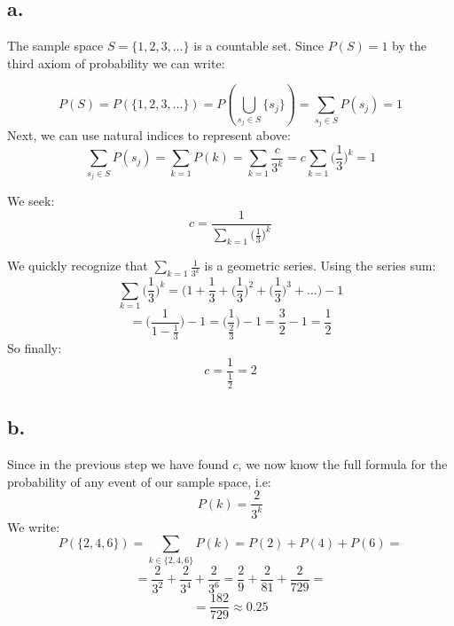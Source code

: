 \documentclass{article}
\begin{document}
\subsection*{a.}

The sample space \(S = \{1, 2, 3, \dots\}\) is a countable set. Since \(P(S) = 1\)
by the third axiom of probability we can write:

\begin{equation*}
    P(S) = P(\{1, 2, 3, \dots\}) = P(\bigcup_{s_{j} \in S} \{s_j\}) = \sum_{s_{j} \in S}P(s_{j}) = 1
\end{equation*}
Next, we can use natural indices to represent above:
\begin{equation*}
    \sum_{s_{j} \in S}P(s_{j}) = \sum_{k=1}P(k)  = \sum_{k=1} \frac{c}{3^{k}} = c \sum_{k=1} \Big(\frac{1}{3}\Big)^{k} = 1
\end{equation*}

We seek:
\begin{equation*}
    c = \frac{1}{\sum_{k=1} \Big(\frac{1}{3}\Big)^{k}}
\end{equation*}

We quickly recognize that \(\sum_{k=1} \frac{1}{3^{k}}\) is a geometric series. Using the series sum:
\begin{equation*}
    \sum_{k=1} \Big(\frac{1}{3}\Big)^{k} = \Big( 1 + \frac{1}{3} + \Big(\frac{1}{3}\Big)^{2} + \Big(\frac{1}{3}\Big)^{3} + \dots \Big) - 1
\end{equation*}
\begin{equation*}
    = \Big(\frac{1}{1 - \frac{1}{3}}\Big) - 1 = \Big(\frac{1}{\frac{2}{3}}\Big) - 1 = \frac{3}{2} - 1 = \frac{1}{2}
\end{equation*}
So finally:
\begin{equation*}
    c = \frac{1}{\frac{1}{2}} = 2
\end{equation*}

\subsection*{b.}
Since in the previous step we have found \(c\), we now know the full formula for the probability
of any event of our sample space, i.e:
\begin{equation*}
    P(k) = \frac{2}{3^{k}}
\end{equation*}
We write:
\begin{equation*}
    P(\{2, 4, 6\}) = \sum_{k \in \{2, 4, 6\}}P(k) = P(2) + P(4) + P(6) =
\end{equation*}
\begin{equation*}
    = \frac{2}{3^{2}} + \frac{2}{3^{4}} + \frac{2}{3^{6}} = \frac{2}{9} + \frac{2}{81} + \frac{2}{729} = 
\end{equation*}
\begin{equation*}
    = \frac{182}{729} \approx 0.25
\end{equation*}
\end{document}
